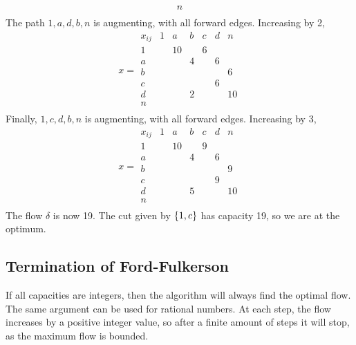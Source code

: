 \begin{example}
\[\begin{array}{c|cccccc}
    n \\
\end{array} \]
The path \( 1,a,d,b,n \) is augmenting, with all forward edges.
Increasing by 2,
\[ x = \begin{array}{c|cccccc}
    x_{ij} & 1 & a & b & c & d & n \\\hline
    1 & & 10 & & 6 & & \\
    a & & & 4 & & 6 & \\
    b & & & & & & 6 \\
    c & & & & & 6 & \\
    d & & & 2 & & & 10 \\
    n \\
\end{array} \]
Finally, \( 1,c,d,b,n \) is augmenting, with all forward edges.
Increasing by 3,
\[ x = \begin{array}{c|cccccc}
    x_{ij} & 1 & a & b & c & d & n \\\hline
    1 & & 10 & & 9 & & \\
    a & & & 4 & & 6 & \\
    b & & & & & & 9 \\
    c & & & & & 9 & \\
    d & & & 5 & & & 10 \\
    n \\
\end{array} \]
The flow \( \delta \) is now 19.
The cut given by \( \qty{1,c} \) has capacity 19, so we are at the optimum.
\end{example}

\subsection{Termination of Ford-Fulkerson}
If all capacities are integers, then the algorithm will always find the optimal flow. The same argument can be used for rational numbers.
At each step, the flow increases by a positive integer value, so after a finite amount of steps it will stop, as the maximum flow is bounded.

